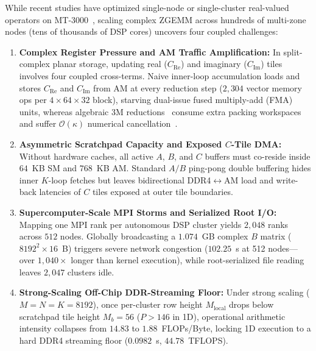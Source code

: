 \documentclass[conference]{IEEEtran}
\begin{document}
While recent studies have optimized single-node or single-cluster real-valued operators on MT-3000~\cite{fang2026mtgemm, mo2024irregular, qi2025constraint, qi2026attention}, scaling complex ZGEMM across hundreds of multi-zone nodes (tens of thousands of DSP cores) uncovers four coupled challenges:
\begin{enumerate}\setlength{\itemsep}{0.5pt}\setlength{\parskip}{0pt}
    \item \textbf{Complex Register Pressure and AM Traffic Amplification:} In split-complex planar storage, updating real ($C_{\mathrm{Re}}$) and imaginary ($C_{\mathrm{Im}}$) tiles involves four coupled cross-terms. Naive inner-loop accumulation loads and stores $C_{\mathrm{Re}}$ and $C_{\mathrm{Im}}$ from AM at every reduction step ($2{,}304$ vector memory ops per $4 \times 64 \times 32$ block), starving dual-issue fused multiply-add (FMA) units, whereas algebraic 3M reductions~\cite{vanzee2017complex} consume extra packing workspaces and suffer $\mathcal{O}(\kappa)$ numerical cancellation~\cite{higham2002accuracy}.
    \item \textbf{Asymmetric Scratchpad Capacity and Exposed $C$-Tile DMA:} Without hardware caches, all active $A$, $B$, and $C$ buffers must co-reside inside $64$~KB SM and $768$~KB AM. Standard $A/B$ ping-pong double buffering hides inner $K$-loop fetches but leaves bidirectional DDR4$\leftrightarrow$AM load and write-back latencies of $C$ tiles exposed at outer tile boundaries.
    \item \textbf{Supercomputer-Scale MPI Storms and Serialized Root I/O:} Mapping one MPI rank per autonomous DSP cluster yields $2{,}048$ ranks across $512$ nodes. Globally broadcasting a $1.074$~GB complex $B$ matrix ($8192^2 \times 16$~B) triggers severe network congestion ($102.25$~s at 512 nodes---over $1{,}040\times$ longer than kernel execution), while root-serialized file reading leaves $2{,}047$ clusters idle.
    \item \textbf{Strong-Scaling Off-Chip DDR-Streaming Floor:} Under strong scaling ($M\!=\!N\!=\!K\!=\!8192$), once per-cluster row height $M_{\mathrm{local}}$ drops below scratchpad tile height $M_b = 56$ ($P > 146$ in 1D), operational arithmetic intensity collapses from $14.83$ to $1.88$~FLOPs/Byte, locking 1D execution to a hard DDR4 streaming floor ($0.0982$~s, $44.78$~TFLOPS).
\end{enumerate}
\end{document}
